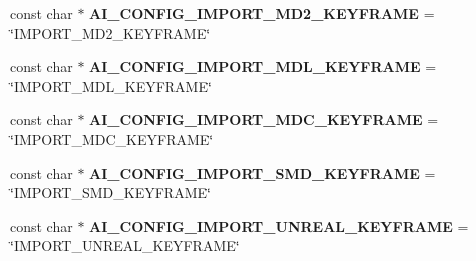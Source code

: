\begin{DoxyCompactItemize}
\item 
\hypertarget{namespaceassimp_1_1config_a841c8b171e12d07ea10bc6f5fe215c29}{const char $\ast$ {\bfseries A\+I\+\_\+\+C\+O\+N\+F\+I\+G\+\_\+\+I\+M\+P\+O\+R\+T\+\_\+\+M\+D2\+\_\+\+K\+E\+Y\+F\+R\+A\+M\+E} = \char`\"{}I\+M\+P\+O\+R\+T\+\_\+\+M\+D2\+\_\+\+K\+E\+Y\+F\+R\+A\+M\+E\char`\"{}}\label{namespaceassimp_1_1config_a841c8b171e12d07ea10bc6f5fe215c29}

\item 
\hypertarget{namespaceassimp_1_1config_ab6b4fbeabdd51d155b355047a9c966dc}{const char $\ast$ {\bfseries A\+I\+\_\+\+C\+O\+N\+F\+I\+G\+\_\+\+I\+M\+P\+O\+R\+T\+\_\+\+M\+D\+L\+\_\+\+K\+E\+Y\+F\+R\+A\+M\+E} = \char`\"{}I\+M\+P\+O\+R\+T\+\_\+\+M\+D\+L\+\_\+\+K\+E\+Y\+F\+R\+A\+M\+E\char`\"{}}\label{namespaceassimp_1_1config_ab6b4fbeabdd51d155b355047a9c966dc}

\item 
\hypertarget{namespaceassimp_1_1config_aa445ce73822ad6419c22a62938186c24}{const char $\ast$ {\bfseries A\+I\+\_\+\+C\+O\+N\+F\+I\+G\+\_\+\+I\+M\+P\+O\+R\+T\+\_\+\+M\+D\+C\+\_\+\+K\+E\+Y\+F\+R\+A\+M\+E} = \char`\"{}I\+M\+P\+O\+R\+T\+\_\+\+M\+D\+C\+\_\+\+K\+E\+Y\+F\+R\+A\+M\+E\char`\"{}}\label{namespaceassimp_1_1config_aa445ce73822ad6419c22a62938186c24}

\item 
\hypertarget{namespaceassimp_1_1config_a85a9dbd864848ae0b39309c57a80837a}{const char $\ast$ {\bfseries A\+I\+\_\+\+C\+O\+N\+F\+I\+G\+\_\+\+I\+M\+P\+O\+R\+T\+\_\+\+S\+M\+D\+\_\+\+K\+E\+Y\+F\+R\+A\+M\+E} = \char`\"{}I\+M\+P\+O\+R\+T\+\_\+\+S\+M\+D\+\_\+\+K\+E\+Y\+F\+R\+A\+M\+E\char`\"{}}\label{namespaceassimp_1_1config_a85a9dbd864848ae0b39309c57a80837a}

\item 
\hypertarget{namespaceassimp_1_1config_a7d44d4f7fff663955ec725430b3e1ffa}{const char $\ast$ {\bfseries A\+I\+\_\+\+C\+O\+N\+F\+I\+G\+\_\+\+I\+M\+P\+O\+R\+T\+\_\+\+U\+N\+R\+E\+A\+L\+\_\+\+K\+E\+Y\+F\+R\+A\+M\+E} = \char`\"{}I\+M\+P\+O\+R\+T\+\_\+\+U\+N\+R\+E\+A\+L\+\_\+\+K\+E\+Y\+F\+R\+A\+M\+E\char`\"{}}\label{namespaceassimp_1_1config_a7d44d4f7fff663955ec725430b3e1ffa}


\end{DoxyCompactItemize}
